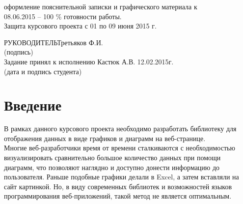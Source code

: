 \documentclass[a4paper,14pt]{extreport}
\begin{document}
\begin{enumerate}
	\underline{\hspace*{16cm}}\hspace*{-16cm}оформление пояснительной записки и графического материала к\\
	\underline{\hspace*{16cm}}\hspace*{-16cm}08.06.2015 – 100 \% готовности работы.\\
	\underline{\hspace*{16cm}}\hspace*{-16cm}Защита курсового проекта с 01 по 09 июня 2015 г.\\
	\end{enumerate}
	\hspace*{7cm}РУКОВОДИТЕЛЬ\underline{\hspace*{6cm}}\hspace*{-3.9cm}Третьяков Ф.И.\\
	\hspace*{11.5cm}\small (подпись) \normalsize\\
	\bigskip
	Задание принял к исполнению \underline{\hspace*{10.5cm}}\hspace*{-8cm}Кастюк А.В. 12.02.2015г.\\
	\hspace*{7cm}\small (дата и подпись студента) \normalsize\\
\newpage
\pagestyle{plain}

\renewcommand\contentsname{СОДЕРЖАНИЕ}
\tableofcontents
\endcenter

\newpage
{}
\chapter*{Введение}
\hspace{4ex}В рамках данного курсового проекта необходимо разработать библиотеку для отображения данных в виде графиков и диаграмм на веб-странице.\\
\hspace{4ex}Многие веб-разработчики время от времени сталкиваются с необходимостью визуализировать сравнительно большое количество данных при помощи диаграмм, что позволяют наглядно и доступно донести информацию до пользователя. Раньше подобные графики делали в Excel, а затем вставляли на сайт картинкой. Но, в виду современных библиотек и возможностей языков программирования веб-приложений, такой метод не является оптимальным.\\
\end{document}

